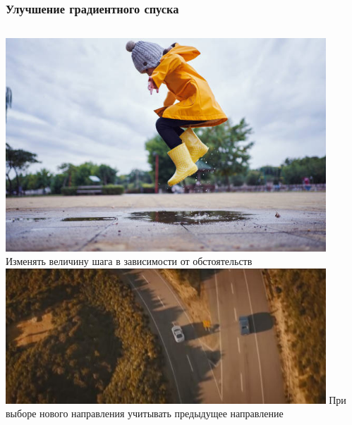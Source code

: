 \documentclass[9pt]{beamer}
\begin{document}
\begin{frame}
    \frametitle{Улучшение градиентного спуска}
    
    \begin{columns}
        \includegraphics[width = 0.9\textwidth]{luzha.jpg}
        Изменять величину шага в зависимости от обстоятельств
        \includegraphics[width = 0.9\textwidth]{razvilka.jpg}
        При выборе нового направления учитывать предыдущее направление
    \end{columns}
\end{frame}
\end{document}
